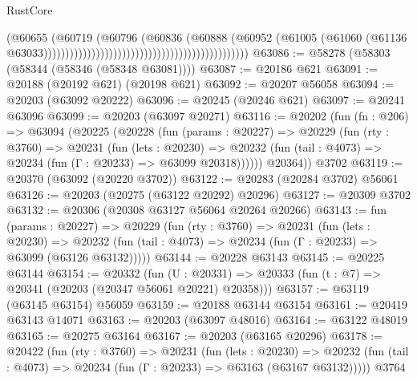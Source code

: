 \begin{lexlean}{RustCore}
\begin{coremodule}
                                                                                (@60655
                                                                                  (@60719
                                                                                    (@60796
                                                                                      (@60836
                                                                                        (@60888
                                                                                          (@60952
                                                                                            (@61005
                                                                                              (@61060
                                                                                                (@61136
                                                                                                  @63033)))))))))))))))))))))))))))))))))))))))))))))))
@63086 := @58278 (@58303 (@58344 (@58346 (@58348 @63081))))
@63087 := @20186 @621
@63091 := @20188 (@20192 @621) (@20198 @621)
@63092 := @20207 @56058
@63094 := @20203 (@63092 @20222)
@63096 := @20245 (@20246 @621)
@63097 := @20241 @63096
@63099 := @20203 (@63097 @20271)
@63116 := @20202
    (fun (fn : @206) =>
    @63094
      (@20225
        (@20228
          (fun (params : @20227) =>
          @20229
            (fun (rty : @3760) =>
            @20231
              (fun (lets : @20230) =>
              @20232 (fun (tail : @4073) => @20234 (fun (Γ : @20233) => @63099 @20318))))))
        @20364))
    @3702
@63119 := @20370 (@63092 (@20220 @3702))
@63122 := @20283 (@20284 @3702) @56061
@63126 := @20203 (@20275 (@63122 @20292) @20296)
@63127 := @20309 @3702
@63132 := @20306 (@20308 @63127 @56064 @20264 @20266)
@63143 := fun (params : @20227) =>
  @20229
    (fun (rty : @3760) =>
    @20231
      (fun (lets : @20230) =>
      @20232 (fun (tail : @4073) => @20234 (fun (Γ : @20233) => @63099 (@63126 @63132)))))
@63144 := @20228 @63143
@63145 := @20225 @63144
@63154 := @20332
    (fun (U : @20331) => @20333 (fun (t : @7) => @20341 (@20203 (@20347 @56061 @20221) @20358)))
@63157 := @63119 (@63145 @63154) @56059
@63159 := @20188 @63144 @63154
@63161 := @20419 @63143 @14071
@63163 := @20203 (@63097 @48016)
@63164 := @63122 @48019
@63165 := @20275 @63164
@63167 := @20203 (@63165 @20296)
@63178 := @20422
    (fun (rty : @3760) =>
    @20231
      (fun (lets : @20230) =>
      @20232 (fun (tail : @4073) => @20234 (fun (Γ : @20233) => @63163 (@63167 @63132)))))
    @3764

\end{coremodule}
\end{lexlean}
